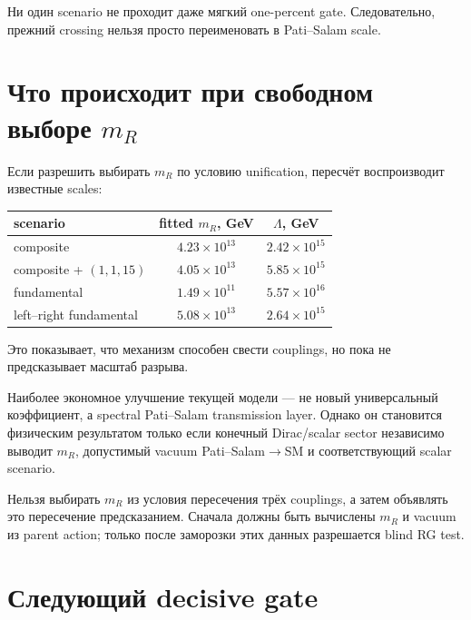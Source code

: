 Ни один scenario не проходит даже мягкий one-percent gate. Следовательно,
прежний crossing нельзя просто переименовать в Pati--Salam scale.

\section{\texorpdfstring{Что происходит при свободном выборе \(m_R\)}{Что происходит при свободном выборе mR}}

Если разрешить выбирать \(m_R\) по условию unification, пересчёт
воспроизводит известные scales:
\begin{center}
\begin{tabular}{lcc}
\toprule
scenario & fitted \(m_R\), GeV & \(\Lambda\), GeV \\
\midrule
composite & \(4.23\times10^{13}\) & \(2.42\times10^{15}\) \\
composite + \((1,1,15)\) & \(4.05\times10^{13}\) & \(5.85\times10^{15}\) \\
fundamental & \(1.49\times10^{11}\) & \(5.57\times10^{16}\) \\
left--right fundamental & \(5.08\times10^{13}\) & \(2.64\times10^{15}\) \\
\bottomrule
\end{tabular}
\end{center}
Это показывает, что механизм способен свести couplings, но пока не
предсказывает масштаб разрыва.

\begin{theorem}
Наиболее экономное улучшение текущей модели --- не новый универсальный
коэффициент, а spectral Pati--Salam transmission layer. Однако он становится
физическим результатом только если конечный Dirac/scalar sector независимо
выводит \(m_R\), допустимый vacuum Pati--Salam\(\to\)SM и соответствующий
scalar scenario.
\end{theorem}

\begin{nogocriterion}
Нельзя выбирать \(m_R\) из условия пересечения трёх couplings, а затем
объявлять это пересечение предсказанием. Сначала должны быть вычислены
\(m_R\) и vacuum из parent action; только после заморозки этих данных
разрешается blind RG test.
\end{nogocriterion}

\section{Следующий decisive gate}

